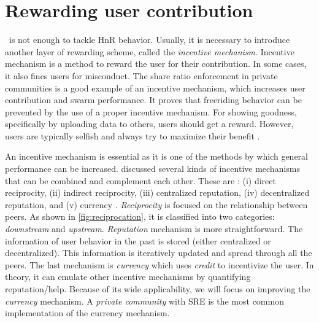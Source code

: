 
\section{Rewarding user contribution}
\label{sec:userreward}

\bt~is not enough to tackle HnR behavior. Usually, it is necessary to introduce another layer of rewarding scheme, called the \textit{incentive mechanism}. Incentive mechanism is a method to reward the user for their contribution. In some cases, it also fines users for misconduct. The share ratio enforcement in private communities is a good example of an incentive mechanism, which increases user contribution and swarm performance. It proves that freeriding behavior can be prevented by the use of a proper incentive mechanism. For showing goodness, specifically by uploading data to others, users should get a reward. However, users are typically selfish and always try to maximize their benefit \cite{2015:incentivep2pgame:kang}.

An incentive mechanism is essential as it is one of the methods by which general performance can be increased. \citeauthor{2011:managesupplydemand:meulpolder} discussed several kinds of incentive mechanisms that can be combined and complement each other. These are : (i) direct reciprocity, (ii) indirect reciprocity, (iii) centralized reputation, (iv) decentralized reputation, and (v) currency \cite{2011:managesupplydemand:meulpolder}. \textit{Reciprocity} is focused on the relationship between peers. As shown in \ref{fig:reciprocation}, it is classified into two categories: \textit{downstream} and \textit{upstream}. \textit{Reputation} mechanism is more straightforward. The information of user behavior in the past is stored (either centralized or decentralized). This information is iteratively updated and spread through all the peers. The last mechanism is \textit{currency} which uses \textit{credit} to incentivize the user. In theory, it can emulate other incentive mechanisms by quantifying reputation/help. Because of its wide applicability, we will focus on improving the \textit{currency} mechanism.  A \textit{private community} with SRE is the most common implementation of the currency mechanism. 

